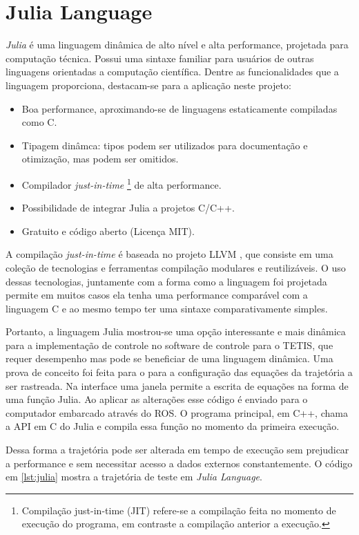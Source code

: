\section{Julia Language}

\textit{Julia} é uma linguagem dinâmica de alto nível e alta performance, projetada para computação técnica. Possui uma sintaxe familiar para usuários de outras linguagens orientadas a computação científica. Dentre as funcionalidades que a linguagem proporciona, destacam-se para a aplicação neste projeto:

\begin{itemize}
\item Boa performance, aproximando-se de linguagens estaticamente compiladas como C.
\item Tipagem dinâmca: tipos podem ser utilizados para documentação e otimização, mas podem ser omitidos.
\item Compilador \textit{just-in-time} \footnote{Compilação just-in-time (JIT) refere-se a compilação feita no momento de execução do programa, em contraste a compilação anterior a execução.} de alta performance.
\item Possibilidade de integrar Julia a projetos C/C++.
\item Gratuito e código aberto (Licença MIT).
\end{itemize}

A compilação \textit{just-in-time} é baseada no projeto LLVM \citep{llvmorg,lattner2004llvm}, que consiste em uma coleção de tecnologias e ferramentas compilação modulares e reutilizáveis. O uso dessas tecnologias, juntamente com a forma como a linguagem foi projetada permite em muitos casos ela tenha uma performance comparável com a linguagem C e ao mesmo tempo ter uma sintaxe comparativamente simples.

Portanto, a linguagem Julia mostrou-se uma opção interessante e mais dinâmica para a implementação de controle no software de controle para o TETIS, que requer desempenho mas pode se beneficiar de uma linguagem dinâmica. Uma prova de conceito foi feita para o para a configuração das equações da trajetória a ser rastreada. Na interface uma janela permite a escrita de equações na forma de uma função Julia. Ao aplicar as alterações esse código é enviado para o computador embarcado através do ROS. O programa principal, em C++, chama a API em C do Julia e compila essa função no momento da primeira execução.

Dessa forma a trajetória pode ser alterada em tempo de execução sem prejudicar a performance e sem necessitar acesso a dados externos constantemente. O código em \ref{lst:julia} mostra a trajetória de teste em \textit{Julia Language}.

